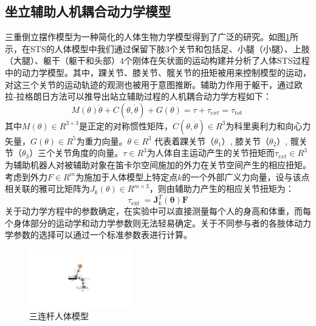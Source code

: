 \subsection{坐立辅助人机耦合动力学模型}  
三重倒立摆作模型为一种简化的人体生物力学模型得到了广泛的研究。如图\ref{fig:4-1}所示，在STS的人体模型中我们通过保留下肢3个关节和包括足、小腿（小腿）、上肢（大腿）、躯干（躯干和头部）4个刚体在矢状面的运动构建并分析了人体STS过程中的动力学模型。其中，踝关节、膝关节、髋关节的扭矩被用来控制模型的运动，对这三个关节的运动轨迹的观测也被用于意图推断。辅助力作用于躯干，通过欧拉-拉格朗日方法可以推导出站立辅助过程的人机耦合动力学方程如下：
\begin{equation}
    M(\theta) \ddot{\theta}+C(\theta, \dot{\theta})+G(\theta)=\tau+\tau_{e x t}=\tau_{\text {tot }}
    \label{eq:4-1}
\end{equation}
其中$M(\theta)\in R^{3\times 3}$是正定的对称惯性矩阵，$C(\theta, \dot{\theta})\in R^3$为科里奥利力和向心力矢量，$G(\theta)\in R^5$为重力向量。$\theta \in R^3$ 代表着踝关节（$\theta_1$）, 膝关节（$\theta_2$）, 髋关节（$\theta_3$）三个关节角度的向量。$\tau \in R^3$为人体自主运动产生的关节扭矩而$\tau_{ext} \in R^3$为辅助机器人对被辅助对象在笛卡尔空间施加的外力在关节空间产生的相应扭矩。考虑到外力$F\in R^m$为施加于人体模型上特定点$k$的一个外部广义力向量，设与该点相关联的雅可比矩阵为$J_k(\theta)\in R^{m\times 3}$，则由辅助力产生的相应关节扭矩为：
\begin{equation}
    \tau_{\text {ext }}=\boldsymbol{J}_k^T(\boldsymbol{\theta}) \boldsymbol{F}
    \label{eq:4-2}
\end{equation}
关于动力学方程中的参数确定，在实验中可以直接测量每个人的身高和体重，而每个身体部分的运动学和动力学参数则无法轻易确定。关于不同参与者的各肢体动力学参数的选择可以通过一个标准参数表进行计算\cite{tozerenHumanBodyDynamics2000}。

\begin{figure}[htb]
    \centering\includegraphics[width=0.4\textwidth]{figures/4-Fig-1.pdf}
    \caption{三连杆人体模型}
    \label{fig:4-1}
\end{figure}
